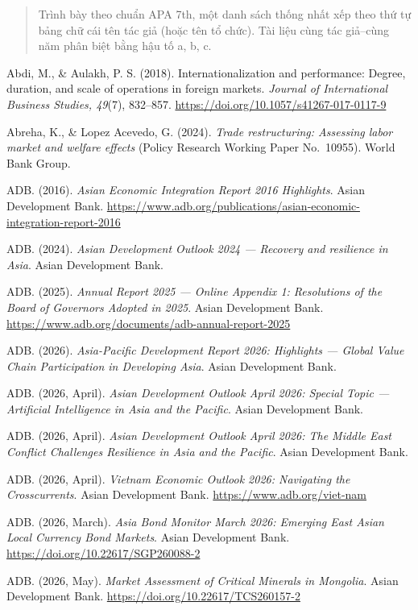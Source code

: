 \documentclass[
  a4paper,
  13pt]{extreport}
\begin{document}
\begin{quote}
Trình bày theo chuẩn APA 7th, một danh sách thống nhất xếp theo thứ tự
bảng chữ cái tên tác giả (hoặc tên tổ chức). Tài liệu cùng tác giả--cùng
năm phân biệt bằng hậu tố a, b, c.
\end{quote}

Abdi, M., \& Aulakh, P. S. (2018). Internationalization and performance:
Degree, duration, and scale of operations in foreign markets.
\emph{Journal of International Business Studies, 49}(7), 832--857.
\url{https://doi.org/10.1057/s41267-017-0117-9}

Abreha, K., \& Lopez Acevedo, G. (2024). \emph{Trade restructuring:
Assessing labor market and welfare effects} (Policy Research Working
Paper No.~10955). World Bank Group.

ADB. (2016). \emph{Asian Economic Integration Report 2016 Highlights}.
Asian Development Bank.
\url{https://www.adb.org/publications/asian-economic-integration-report-2016}

ADB. (2024). \emph{Asian Development Outlook 2024 --- Recovery and
resilience in Asia}. Asian Development Bank.

ADB. (2025). \emph{Annual Report 2025 --- Online Appendix 1: Resolutions
of the Board of Governors Adopted in 2025}. Asian Development Bank.
\url{https://www.adb.org/documents/adb-annual-report-2025}

ADB. (2026). \emph{Asia-Pacific Development Report 2026: Highlights ---
Global Value Chain Participation in Developing Asia}. Asian Development
Bank.

ADB. (2026, April). \emph{Asian Development Outlook April 2026: Special
Topic --- Artificial Intelligence in Asia and the Pacific}. Asian
Development Bank.

ADB. (2026, April). \emph{Asian Development Outlook April 2026: The
Middle East Conflict Challenges Resilience in Asia and the Pacific}.
Asian Development Bank.

ADB. (2026, April). \emph{Vietnam Economic Outlook 2026: Navigating the
Crosscurrents}. Asian Development Bank.
\url{https://www.adb.org/viet-nam}

ADB. (2026, March). \emph{Asia Bond Monitor March 2026: Emerging East
Asian Local Currency Bond Markets}. Asian Development Bank.
\url{https://doi.org/10.22617/SGP260088-2}

ADB. (2026, May). \emph{Market Assessment of Critical Minerals in
Mongolia}. Asian Development Bank.
\url{https://doi.org/10.22617/TCS260157-2}
\end{document}

